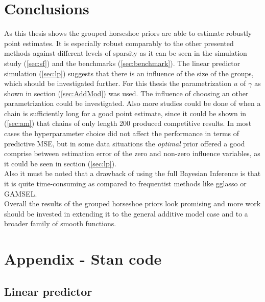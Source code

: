 \documentclass[12pt,letterpaper]{article}
\numberwithin{equation}{subsection}
\begin{document}
\section{Conclusions}
As this thesis shows the grouped horseshoe priors are able to estimate robustly point estimates. It is especially robust comparably to the other presented methods against different levels of sparsity as it can be seen in the simulation study (\ref{sec:sf}) and the benchmarks (\ref{sec:benchmark}).
The linear predictor simulation (\ref{sec:lp}) suggests that there is an influence of the size of the groups, which should be investigated further. For this thesis the parametrization $u$ of $\gamma$ as shown in section (\ref{sec:AddMod}) was used. The influence of choosing an other parametrization could be investigated. Also more studies could be done of when a chain is sufficiently long for a good point estimate, since it could be shown in (\ref{sec:am}) that chains of only length 200 produced competitive results. In most cases the hyperparameter choice did not affect the performance in terms of predictive MSE, but in some data situations the \textit{optimal} prior offered a good comprise between estimation error of the zero and non-zero influence variables, as it could be seen in section (\ref{sec:lp}).\\
Also it must be noted that a drawback of using the full Bayesian Inference is that it is quite time-consuming as compared to frequentist methods like gglasso or GAMSEL.  \\
Overall the results of the grouped horseshoe priors look promising and more work should be invested in extending it to the general additive model case and to a broader family of smooth functions. 
\pagebreak
\section{Appendix - Stan code} 
\subsection{Linear predictor}

\pagebreak
\end{document}
